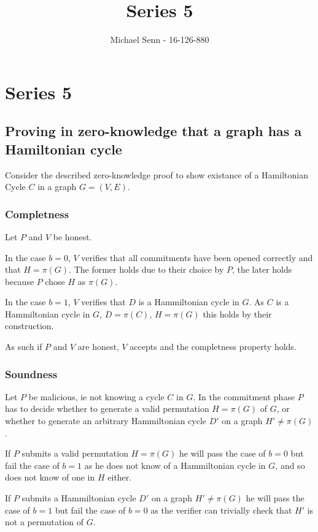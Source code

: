 \documentclass[a4paper]{scrreprt}
\title{Series 5}
\author{Michael Senn \maillink{michael.senn@students.unibe.ch} - 16-126-880}
\date{\printdate}
\begin{document}
\maketitle


\setcounter{chapter}{4}

\chapter{Series 5}

\section{Proving in zero-knowledge that a graph has a Hamiltonian cycle}

Consider the described zero-knowledge proof to show existance of a Hamiltonian
Cycle $C$ in a graph $G = (V, E)$.

\subsection{Completness}

Let $P$ and $V$ be honest.

In the case $b = 0$, $V$ verifies that all commitments have been opened
correctly and that $H = \pi(G)$. The former holds due to their choice by $P$,
the later holds because $P$ chose $H$ as $\pi(G)$.

In the case $b = 1$, $V$ verifies that $D$ is a Hammiltonian cycle in $G$. As
$C$ is a Hammiltonian cycle in $G$, $D = \pi(C)$, $H = \pi(G)$ this holds by
their construction.

As such if $P$ and $V$ are honest, $V$ accepts and the completness property
holds.

\subsection{Soundness}

Let $P$ be malicious, ie not knowing a cycle $C$ in $G$. In the commitment
phase $P$ has to decide whether to generate a valid permutation $H = \pi(G)$ of
$G$, or whether to generate an arbitrary Hammiltonian cycle $D'$ on a graph $H'
\neq \pi(G)$.

If $P$ submits a valid permutation $H = \pi(G)$ he will pass the case of $b =
0$ but fail the case of $b = 1$ as he does not know of a Hammiltonian cycle in
$G$, and so does not know of one in $H$ either.

If $P$ submits a Hammiltonian cycle $D'$ on a graph $H' \neq \pi(G)$ he will
pass the case of $b = 1$ but fail the case of $b = 0$ as the verifier can
trivially check that $H'$ is not a permutation of $G$.
\end{document}
